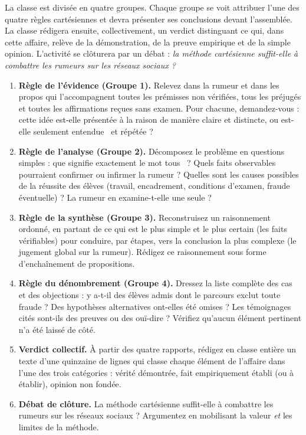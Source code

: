 \documentclass[11pt]{article}
\newcounter{popsec}
\newcounter{popsub}
\newcommand{\courssub}[1]{%
  \stepcounter{popsub}%
  \par\vspace{9pt}\noindent{\popxbold\fontsize{11.5}{13}\selectfont\color{popink}{\color{poporange}\thepopsec.\thepopsub}\hspace{6pt}#1}\par\nopagebreak\vspace{4pt}
}
\begin{document}
La classe est divisée en quatre groupes. Chaque groupe se voit attribuer l'une des quatre règles cartésiennes et devra présenter ses conclusions devant l'assemblée. La classe rédigera ensuite, collectivement, un verdict distinguant ce qui, dans cette affaire, relève de la démonstration, de la preuve empirique et de la simple opinion. L'activité se clôturera par un débat : \emph{la méthode cartésienne suffit-elle à combattre les rumeurs sur les réseaux sociaux ?}

\courssub{Consignes}

\begin{enumerate}
  \item \textbf{Règle de l'évidence (Groupe 1).} Relevez dans la rumeur et dans les propos qui l'accompagnent toutes les prémisses non vérifiées, tous les préjugés et toutes les affirmations reçues sans examen. Pour chacune, demandez-vous : cette idée est-elle présentée à la raison de manière claire et distincte, ou est-elle seulement \guillemotleft entendue \guillemotright\ et répétée ?
  \item \textbf{Règle de l'analyse (Groupe 2).} Décomposez le problème en questions simples : que signifie exactement le mot \guillemotleft tous \guillemotright\ ? Quels faits observables pourraient confirmer ou infirmer la rumeur ? Quelles sont les causes possibles de la réussite des élèves (travail, encadrement, conditions d'examen, fraude éventuelle) ? La rumeur en examine-t-elle une seule ?
  \item \textbf{Règle de la synthèse (Groupe 3).} Reconstruisez un raisonnement ordonné, en partant de ce qui est le plus simple et le plus certain (les faits vérifiables) pour conduire, par étapes, vers la conclusion la plus complexe (le jugement global sur la rumeur). Rédigez ce raisonnement sous forme d'enchaînement de propositions.
  \item \textbf{Règle du dénombrement (Groupe 4).} Dressez la liste complète des cas et des objections : y a-t-il des élèves admis dont le parcours exclut toute fraude ? Des hypothèses alternatives ont-elles été omises ? Les témoignages cités sont-ils des preuves ou des ouï-dire ? Vérifiez qu'aucun élément pertinent n'a été laissé de côté.
  \item \textbf{Verdict collectif.} À partir des quatre rapports, rédigez en classe entière un texte d'une quinzaine de lignes qui classe chaque élément de l'affaire dans l'une des trois catégories : vérité démontrée, fait empiriquement établi (ou à établir), opinion non fondée.
  \item \textbf{Débat de clôture.} La méthode cartésienne suffit-elle à combattre les rumeurs sur les réseaux sociaux ? Argumentez en mobilisant la valeur \emph{et} les limites de la méthode.
\end{enumerate}
\end{document}
